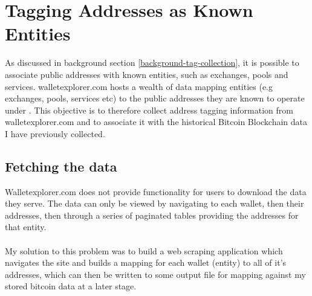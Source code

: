 \section{Tagging Addresses as Known Entities}\label{section-entity-tagging}
As discussed in background section \ref{background-tag-collection}, it is possible to associate public addresses with known entities, such as exchanges, pools and services. walletexplorer.com hosts a wealth of data mapping entities (e.g exchanges, pools, services etc) to the public addresses they are known to operate under \cite{RefWorks:doc:5c4b26f3e4b0ea619646d513}. This objective is to therefore collect address tagging information from walletexplorer.com and to associate it with the historical Bitcoin Blockchain data I have previously collected.

\subsection{Fetching the data}\label{design:fetch-entity-data}
Walletexplorer.com does not provide functionality for users to download the data they serve. The data can only be viewed by navigating to each wallet, then their addresses, then through a series of paginated tables providing the addresses for that entity.
\\\\
My solution to this problem was to build a web scraping application which navigates the site and builds a mapping for each wallet (entity) to all of it's addresses, which can then be written to some output file for mapping against my stored bitcoin data at a later stage. 

